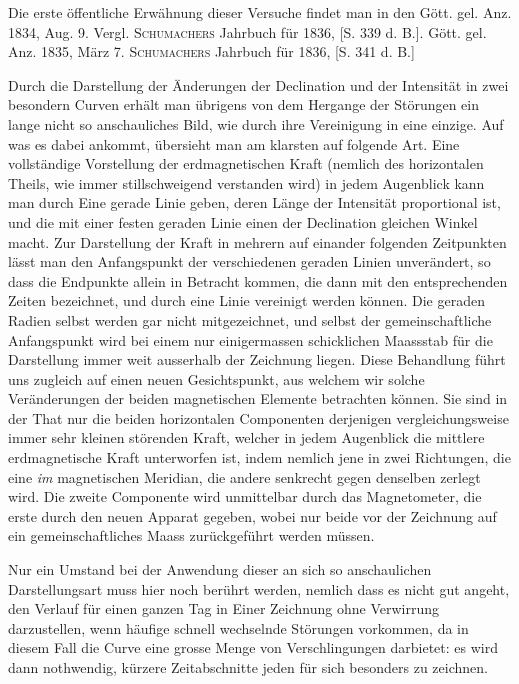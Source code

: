 \expandafter\def\csname HistoricalNoteText376\endcsname{Die erste öffentliche Erwähnung dieser Versuche findet man in den Gött. gel. Anz. 1834, Aug. 9. Vergl. \textsc{Schumachers} Jahrbuch für 1836, [S. 339 d. B.].}
\expandafter\def\csname HistoricalNoteText376b\endcsname{Gött. gel. Anz. 1835, März 7. \textsc{Schumachers} Jahrbuch für 1836, [S. 341 d. B.]}
\par
{}Durch die Darstellung der Änderungen der Declination und der Intensität in zwei besondern Curven erhält man übrigens von dem Hergange der Störungen ein lange nicht so anschauliches Bild, wie durch ihre Vereinigung in eine einzige. Auf was es dabei ankommt, übersieht man am klarsten auf folgende Art. Eine vollständige Vorstellung der erdmagnetischen Kraft (nemlich des horizontalen Theils, wie immer stillschweigend verstanden wird) in jedem Augenblick kann man durch Eine gerade Linie geben, deren Länge der Intensität proportional ist, und die mit einer festen geraden Linie einen der Declination gleichen Winkel macht. Zur Darstellung der Kraft in mehrern auf einander folgenden Zeitpunkten lässt man den Anfangspunkt der verschiedenen geraden Linien unverändert, so dass die Endpunkte allein in Betracht kommen, die dann mit den entsprechenden Zeiten bezeichnet, und durch eine Linie vereinigt werden können. Die geraden Radien selbst werden gar nicht mitgezeichnet, und selbst der gemeinschaftliche Anfangspunkt wird bei einem nur einigermassen schicklichen Maassstab für die Darstellung immer weit ausserhalb der Zeichnung liegen. Diese Behandlung führt uns zugleich auf einen neuen Gesichtspunkt, aus welchem wir solche Veränderungen der beiden magnetischen Elemente betrachten können. Sie sind in der That nur die beiden horizontalen Componenten derjenigen vergleichungsweise immer sehr kleinen störenden Kraft, welcher in jedem Augenblick die mittlere erdmagnetische Kraft unterworfen ist, indem nemlich jene in zwei Richtungen, die eine \textit{im} magnetischen Meridian, die andere senkrecht gegen denselben zerlegt wird. Die zweite Componente wird unmittelbar durch das Magnetometer, die erste durch den neuen Apparat gegeben, wobei nur beide vor der Zeichnung auf ein gemeinschaftliches Maass zurückgeführt werden müssen.

Nur ein Umstand bei der Anwendung dieser an sich so anschaulichen Darstellungsart muss hier noch berührt werden, nemlich dass es nicht gut angeht, den Verlauf für einen ganzen Tag in Einer Zeichnung ohne Verwirrung darzustellen, wenn häufige schnell wechselnde Störungen vorkommen, da in diesem Fall die Curve eine grosse Menge von Verschlingungen darbietet: es wird dann nothwendig, kürzere Zeitabschnitte jeden für sich besonders zu zeichnen.


